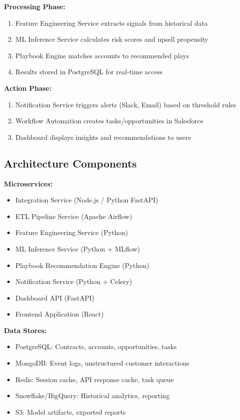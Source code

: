 \documentclass[12pt,a4paper]{article}
\begin{document}
\textbf{Processing Phase:}
\begin{enumerate}
    \item Feature Engineering Service extracts signals from historical data
    \item ML Inference Service calculates risk scores and upsell propensity
    \item Playbook Engine matches accounts to recommended plays
    \item Results stored in PostgreSQL for real-time access
\end{enumerate}

\textbf{Action Phase:}
\begin{enumerate}
    \item Notification Service triggers alerts (Slack, Email) based on threshold rules
    \item Workflow Automation creates tasks/opportunities in Salesforce
    \item Dashboard displays insights and recommendations to users
\end{enumerate}

\subsection{Architecture Components}
\textbf{Microservices:}
\begin{itemize}
    \item Integration Service (Node.js / Python FastAPI)
    \item ETL Pipeline Service (Apache Airflow)
    \item Feature Engineering Service (Python)
    \item ML Inference Service (Python + MLflow)
    \item Playbook Recommendation Engine (Python)
    \item Notification Service (Python + Celery)
    \item Dashboard API (FastAPI)
    \item Frontend Application (React)
\end{itemize}

\textbf{Data Stores:}
\begin{itemize}
    \item PostgreSQL: Contracts, accounts, opportunities, tasks
    \item MongoDB: Event logs, unstructured customer interactions
    \item Redis: Session cache, API response cache, task queue
    \item Snowflake/BigQuery: Historical analytics, reporting
    \item S3: Model artifacts, exported reports
\end{itemize}
\end{document}
